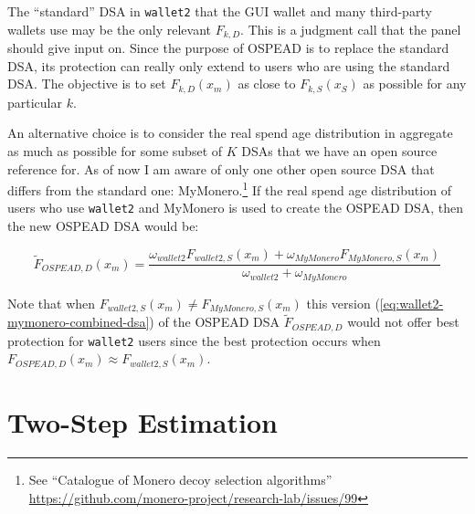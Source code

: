 \documentclass[english]{article}
\begin{document}
The ``standard'' DSA in \texttt{wallet2} that the GUI wallet and
many third-party wallets use may be the only relevant $F_{k,D}$.
This is a judgment call that the panel should give input on. Since
the purpose of OSPEAD is to replace the standard DSA, its protection
can really only extend to users who are using the standard DSA. The
objective is to set $F_{k,D}(x_{m})$ as close to $F_{k,S}(x_{S})$
as possible for any particular $k$. 

An alternative choice is to consider the real spend age distribution
in aggregate as much as possible for some subset of $K$ DSAs that
we have an open source reference for. As of now I am aware of only
one other open source DSA that differs from the standard one: MyMonero.\footnote{See ``Catalogue of Monero decoy selection algorithms'' \href{https://github.com/monero-project/research-lab/issues/99}{https://github.com/monero-project/research-lab/issues/99}}
If the real spend age distribution of users who use \texttt{wallet2}
and MyMonero is used to create the OSPEAD DSA, then the new OSPEAD
DSA would be:

\begin{equation}
\tilde{F}_{OSPEAD,D}(x_{m})=\dfrac{\omega_{wallet2}F_{wallet2,S}(x_{m})+\omega_{MyMonero}F_{MyMonero,S}(x_{m})}{\omega_{wallet2}+\omega_{MyMonero}}\label{eq:wallet2-mymonero-combined-dsa}
\end{equation}

Note that when $F_{wallet2,S}(x_{m})\neq F_{MyMonero,S}(x_{m})$ this
version (\ref{eq:wallet2-mymonero-combined-dsa}) of the OSPEAD DSA
$\tilde{F}_{OSPEAD,D}$ would not offer best protection for \texttt{wallet2}
users since the best protection occurs when $F_{OSPEAD,D}(x_{m})\approx F_{wallet2,S}(x_{m})$.

\section{Two-Step Estimation\label{sec:Two-Step-Estimation}}
\end{document}
